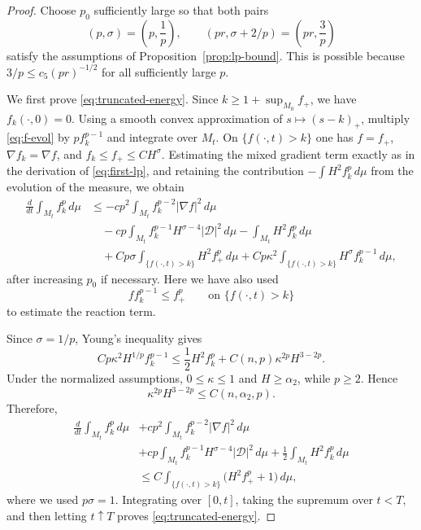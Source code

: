 \documentclass[11pt,reqno]{amsart}
\theoremstyle{definition}
\theoremstyle{remark}
\numberwithin{equation}{section}
\begin{document}
\begin{proof}
Choose $p_0$ sufficiently large so that both pairs
\begin{equation*}
 (p,\sigma)=\left(p,\frac1p\right),
 \qquad
 (pr,\sigma+2/p)=\left(pr,\frac3p\right)
\end{equation*}
satisfy the assumptions of Proposition~\ref{prop:lp-bound}.  This is possible
because $3/p\leq c_5(pr)^{-1/2}$ 
for all sufficiently large $p$.

We first prove \eqref{eq:truncated-energy}.  Since
$k\geq1+\sup_{M_0}f_+$, we have $f_k(\cdot,0)=0$.  Using a smooth convex
approximation of $s\mapsto(s-k)_+$, multiply \eqref{eq:f-evol} by
$pf_k^{p-1}$ and integrate over $M_t$.  On $\{f(\cdot,t)>k\}$ one has
$f=f_+$, $\nabla f_k=\nabla f$, and
$f_k\leq f_+\leq C H^\sigma$.  Estimating the mixed gradient term exactly
as in the derivation of \eqref{eq:first-lp}, and retaining the contribution
$-\int H^2f_k^p\,d\mu$ from the evolution of the measure, we obtain
\begin{align*}
 \frac{d}{dt}\int_{M_t}f_k^p\,d\mu
 &\leq
 -cp^2\int_{M_t}f_k^{p-2}|\nabla f|^2\,d\mu\\
 &\quad
 -cp\int_{M_t}f_k^{p-1}H^{\sigma-4}
 |\mathcal D|^2\,d\mu
 -\int_{M_t}H^2f_k^p\,d\mu\\
 &\quad
 +Cp\sigma\int_{\{f(\cdot,t)>k\}}H^2f_+^p\,d\mu
 +Cp\kappa^2\int_{\{f(\cdot,t)>k\}}H^\sigma f_k^{p-1}\,d\mu,
\end{align*}
after increasing $p_0$ if necessary.  Here we have also used
\begin{equation*}
 f f_k^{p-1}\leq f_+^p
 \qquad\text{on }\{f(\cdot,t)>k\}
\end{equation*}
to estimate the reaction term.

Since $\sigma=1/p$, Young's inequality gives
\begin{equation*}
 Cp\kappa^2H^{1/p}f_k^{p-1}
 \leq
 \frac12H^2f_k^p
 +C(n,p)\kappa^{2p}H^{3-2p}.
\end{equation*}
Under the normalized assumptions,
$0\leq\kappa\leq1$ and $H\geq\alpha_2$, while $p\geq2$. Hence
\begin{equation*}
 \kappa^{2p}H^{3-2p}\leq C(n,\alpha_2,p).
\end{equation*}
Therefore,
\begin{align*}
 \frac{d}{dt}\int_{M_t}f_k^p\,d\mu
 &+cp^2\int_{M_t}f_k^{p-2}|\nabla f|^2\,d\mu\\
 &+cp\int_{M_t}f_k^{p-1}H^{\sigma-4}
 |\mathcal D|^2\,d\mu
 +\frac12\int_{M_t}H^2f_k^p\,d\mu\\
 &\leq
 C\int_{\{f(\cdot,t)>k\}}\bigl(H^2f_+^p+1\bigr)\,d\mu,
\end{align*}
where we used $p\sigma=1$.  Integrating over $[0,t]$, taking the supremum
over $t<T$, and then letting $t\uparrow T$ proves
\eqref{eq:truncated-energy}.


\end{proof}
\end{document}
